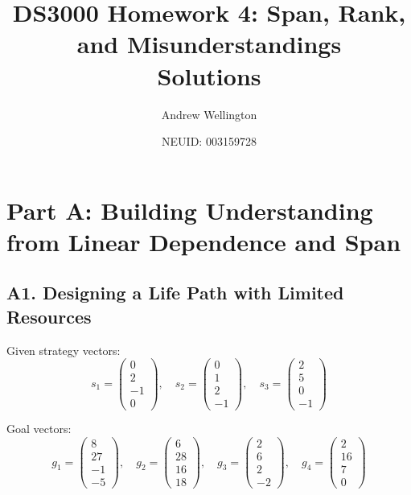 \documentclass[12pt]{article}
\title{DS3000 Homework 4: Span, Rank, and Misunderstandings \\ \large Solutions}
\author{Andrew Wellington}
\date{NEUID: 003159728}
\theoremstyle{definition}
\begin{document}
\maketitle

\section*{Part A: Building Understanding from Linear Dependence and Span}

\subsection*{A1. Designing a Life Path with Limited Resources}

Given strategy vectors:
\[
s_1 = \begin{pmatrix} 0 \\ 2 \\ -1 \\ 0 \end{pmatrix}, \quad
s_2 = \begin{pmatrix} 0 \\ 1 \\ 2 \\ -1 \end{pmatrix}, \quad
s_3 = \begin{pmatrix} 2 \\ 5 \\ 0 \\ -1 \end{pmatrix}
\]

Goal vectors:
\[
g_1 = \begin{pmatrix} 8 \\ 27 \\ -1 \\ -5 \end{pmatrix}, \quad
g_2 = \begin{pmatrix} 6 \\ 28 \\ 16 \\ 18 \end{pmatrix}, \quad
g_3 = \begin{pmatrix} 2 \\ 6 \\ 2 \\ -2 \end{pmatrix}, \quad
g_4 = \begin{pmatrix} 2 \\ 16 \\ 7 \\ 0 \end{pmatrix}
\]
\end{document}
